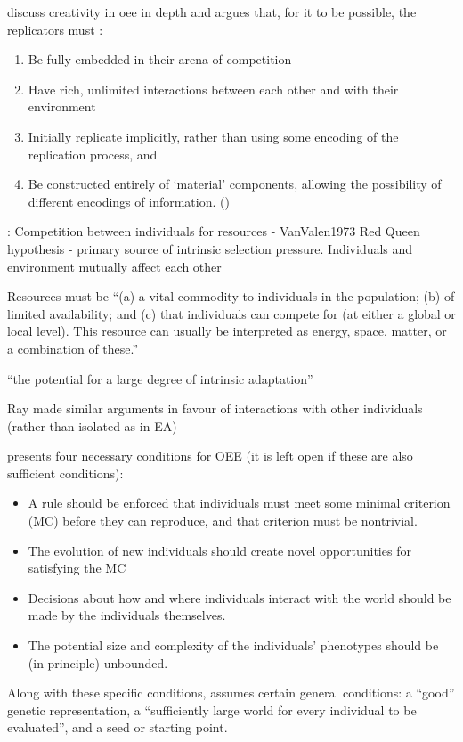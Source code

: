 \Textcite{Taylor2001,Taylor:1999sc} discuss creativity in \gls{oee} in depth and argues that, for it to be possible, the replicators must \parencite{Hutton2004}:
\begin{enumerate}[label=\roman*] 
	\item Be fully embedded in their arena of competition 
	\item Have rich, unlimited interactions between each other and with their environment 
	\item Initially replicate implicitly, rather than using some encoding of the replication process, and 
	\item Be constructed entirely of `material' components, allowing the possibility of different encodings of information. ()
\end{enumerate}

\parencite{Taylor2001}:
Competition between individuals for resources - VanValen1973 Red Queen
hypothesis - primary source of intrinsic selection pressure.
Individuals and environment mutually affect each other

Resources must be ``(a) a vital commodity to individuals in the population; (b) of limited availability; and (c) that individuals can compete for (at either a global or local level). This resource can usually be interpreted as energy, space, matter, or a combination of these.''

``the potential for a large degree of intrinsic adaptation''

Ray made similar arguments in favour of interactions with other individuals (rather than isolated as in EA) 		

\parencite{Soros2014} presents four necessary conditions for OEE (it is left open if these are also sufficient conditions):
\begin{itemize}
	\item A rule should be enforced that individuals must meet some minimal criterion (MC) before they can reproduce, and that criterion must be nontrivial.
	\item The evolution of new individuals should create novel opportunities for satisfying the MC
	\item Decisions about how and where individuals interact with the world should be made by the individuals themselves.
	\item The potential size and complexity of the individuals' phenotypes should be (in principle) unbounded.
\end{itemize}
Along with these specific conditions, \parencite{Soros2014} assumes certain general conditions: a ``good'' genetic representation, a ``sufficiently large world for every individual to be evaluated'', and a seed or starting point.

